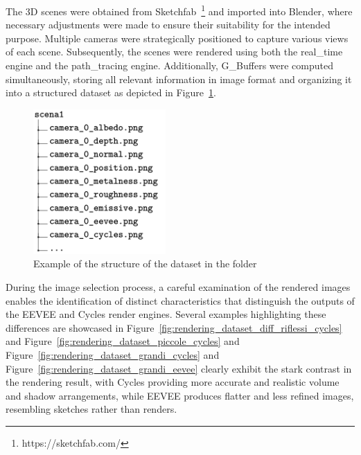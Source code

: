 The 3D scenes were obtained from Sketchfab~\footnote{https://sketchfab.com/} and imported into Blender, where necessary adjustments were made to ensure their suitability for the intended purpose. Multiple cameras were strategically positioned to capture various views of each scene. Subsequently, the scenes were rendered using both the real_time engine and the path_tracing engine. Additionally, G_Buffers were computed simultaneously, storing all relevant information in image format and organizing it into a structured dataset as depicted in Figure~\ref{fig:render_dataset_structure}.

\begin{figure}
    \centering
    \includegraphics[width=0.45\textwidth]{figures/methods/StrutturaCartellaDataset.png}
    \caption{Example of the structure of the dataset in the folder}
    \label{fig:render_dataset_structure}
\end{figure}

During the image selection process, a careful examination of the rendered images enables the identification of distinct characteristics that distinguish the outputs of the EEVEE and Cycles render engines. Several examples highlighting these differences are showcased in Figure~\ref{fig:rendering_dataset_diff_riflessi_cycles} and Figure~\ref{fig:rendering_dataset_piccole_cycles} and Figure~\ref{fig:rendering_dataset_grandi_cycles} and Figure~\ref{fig:rendering_dataset_grandi_eevee} clearly exhibit the stark contrast in the rendering result, with Cycles providing more accurate and realistic volume and shadow arrangements, while EEVEE produces flatter and less refined images, resembling sketches rather than renders.

